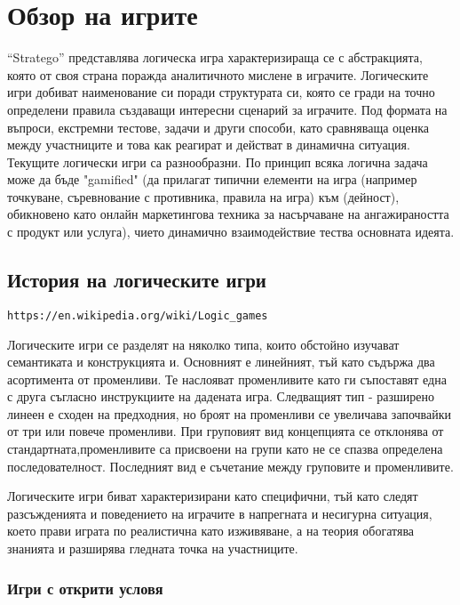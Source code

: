 ﻿\newpage
\chapter{Обзор на игрите}
\label{chapter01}

“Stratego” представлява логическа игра характеризираща се с абстракцията, която от своя страна поражда аналитичното мислене в играчите. Логическите игри добиват наименование си поради структурата си, която се гради на точно определени правила създаващи интересни сценарий за играчите. Под формата на въпроси, екстремни тестове, задачи и други способи, като сравняваща оценка между участниците и това как реагират и действат в динамична ситуация. Текущите логически игри са разнообразни. По принцип всяка логична задача може да бъде "gamified" (да прилагат типични елементи на игра (например точкуване, съревнование с противника, правила на игра) към (дейност), обикновено като онлайн маркетингова техника за насърчаване на ангажираността с продукт или услуга), чието динамично взаимодействие тества основната идеята. 

\section{История на логическите игри}

\begin{lstlisting}
https://en.wikipedia.org/wiki/Logic_games
\end{lstlisting}

Логическите игри се разделят на няколко типа, които обстойно изучават семантиката и конструкцията и. Основният е линейният, тъй като съдържа два асортимента от променливи. Те наслояват променливите като ги съпоставят една с друга съгласно инструкциите на дадената игра. Следващият тип - разширено линеен е сходен на предходния, но броят на променливи се увеличава започвайки от три или повече променливи. При груповият вид концепцията се отклонява от стандартната,променливите са присвоени на групи като не се спазва определена последователност. Последният вид е съчетание между груповите и променливите.

Логическите игри биват характеризирани като специфични, тъй като следят разсъжденията и поведението на играчите в напрегната и несигурна ситуация, което прави играта по реалистична като изживяване, а на теория обогатява знанията и разширява гледната точка на участниците.

\subsection{Игри с открити условя}

